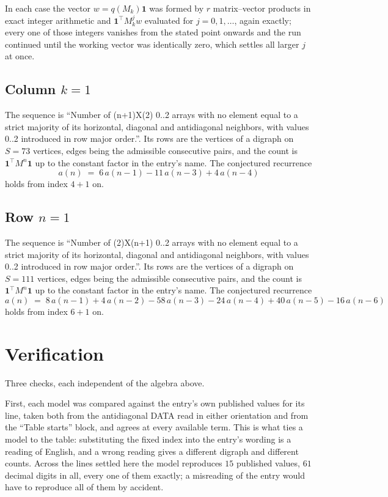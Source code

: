 \documentclass[11pt,a4paper]{article}
\theoremstyle{plain}
\theoremstyle{definition}
\begin{document}
In each case the vector $w=q(M_k)\mathbf{1}$ was formed by $r$ matrix--vector products in
exact integer arithmetic and $\mathbf{1}^{\!\top}M_k^{j}w$ evaluated for $j=0,1,\dots$,
again exactly; every one of those integers vanishes from the stated point onwards and the run
continued until the working vector was identically zero, which settles all larger $j$ at once.

\subsection*{Column $k$$=1$}
The sequence is ``Number of (n+1)X(2) 0..2 arrays with no element equal to a strict majority of its horizontal, diagonal and antidiagonal neighbors, with values 0..2 introduced in row major order.''. Its rows are the vertices of a digraph on
$S=73$ vertices, edges being the admissible consecutive pairs, and the count is
$\mathbf{1}^{\!\top}M^{n}\mathbf{1}$ up to the constant factor in the entry's name.
The conjectured recurrence
\[
a(n)\;=\;6\,a(n-1) - 11\,a(n-3) + 4\,a(n-4)
\]
holds from index $4+1$ on.

\subsection*{Row $n$$=1$}
The sequence is ``Number of (2)X(n+1) 0..2 arrays with no element equal to a strict majority of its horizontal, diagonal and antidiagonal neighbors, with values 0..2 introduced in row major order.''. Its rows are the vertices of a digraph on
$S=111$ vertices, edges being the admissible consecutive pairs, and the count is
$\mathbf{1}^{\!\top}M^{n}\mathbf{1}$ up to the constant factor in the entry's name.
The conjectured recurrence
\[
a(n)\;=\;8\,a(n-1) + 4\,a(n-2) - 58\,a(n-3) - 24\,a(n-4) + 40\,a(n-5) - 16\,a(n-6)
\]
holds from index $6+1$ on.

\section{Verification}

Three checks, each independent of the algebra above.

First, each model was compared against the entry's own published values for its line, taken
both from the antidiagonal DATA read in either orientation and from the ``Table starts''
block, and agrees at every available term. This is what ties a model to the table:
substituting the fixed index into the entry's wording is a reading of English, and a wrong
reading gives a different digraph and different counts. Across the lines settled here the
model reproduces $15$ published values, $61$ decimal digits in all, every one of
them exactly; a misreading of the entry would have to reproduce all of them by accident.
\end{document}
